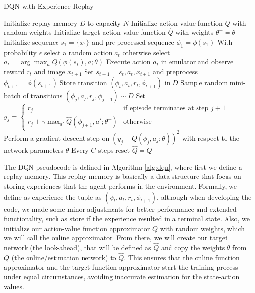 \begin{algorithm}
	\caption{DQN with Experience Replay}
	\label{alg:dqn}
	\begin{algorithmic}[1]
		\State Initialize replay memory $D$ to capacity $N$
		\State Initialize action-value function $Q$ with random weights
		\State Initialize target action-value function $\hat{Q}$ with weights $\theta^{-} = \theta$
		\State Initialize sequence $s_1 = \{x_1\}$ and pre-processed sequence $\phi_1 = \phi(s_1)$
		\State With probability $\epsilon$ select a random action $a_t$
		\State otherwise select $a_t = \arg\max_a Q(\phi(s_t), a; \theta)$
		\State Execute action $a_t$ in emulator and observe reward $r_t$ and image $x_{t+1}$
		\State Set $s_{t+1} = s_t, a_t, x_{t+1}$ and preprocess $\phi_{t+1} = \phi(s_{t+1})$
		\State Store transition $(\phi_t, a_t, r_t, \phi_{t+1})$ in $D$
		\State Sample random mini-batch of transitions $(\phi_j, a_j, r_j, \phi_{j+1}) \sim D$
		\State Set $y_j = 
		\begin{cases} 
			r_j & \text{if episode terminates at step } j+1 \\
			r_j + \gamma \max_{a'} \hat{Q}(\phi_{j+1}, a'; \theta^{-}) & \text{otherwise}
		\end{cases}$
		\State Perform a gradient descent step on $(y_j - Q(\phi_j, a_j; \theta))^2$ with respect to the network parameters $\theta$
		\State Every $C$ steps reset $\hat{Q} = Q$
		\EndFor
		\EndFor
	\end{algorithmic}
	
\end{algorithm}

The DQN pseudocode is defined in Algorithm \ref{alg:dqn}, where first we define a replay memory. This replay memory is basically a data structure that focus on storing experiences that the agent performs in the environment. Formally, we define as experience the tuple as $(\phi_t, a_t, r_t, \phi_{t+1})$, although when developing the code, we made some minor adjustments for better performance and extended functionality, such as store if the experience resulted in a terminal state. Also, we initialize our action-value function approximator $Q$ with random weights, which we will call the online approximator. From there, we will create our target network (the look-ahead), that will be defined as $\hat{Q}$ and copy the weights $\theta$ from $Q$ (the online/estimation network) to $\hat{Q}$. This ensures that the online function approximator and the target function approximator start the training process under equal circumstances, avoiding inaccurate estimation for the state-action values.

